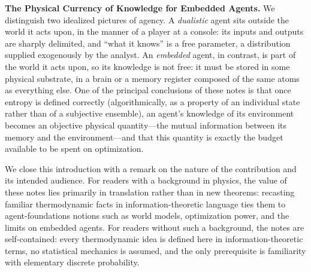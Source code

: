 \documentclass[10pt]{article}
\theoremstyle{definition}
\theoremstyle{remark}
\begin{document}
\textbf{The Physical Currency of Knowledge for Embedded Agents.} We distinguish two idealized pictures of agency. A \emph{dualistic} agent sits outside the world it acts upon, in the manner of a player at a console: its inputs and outputs are sharply delimited, and ``what it knows'' is a free parameter, a distribution supplied exogenously by the analyst. An \emph{embedded} agent, in contrast, is part of the world it acts upon, so its knowledge is not free: it must be stored in some physical substrate, in a brain or a memory register composed of the same atoms as everything else. One of the principal conclusions of these notes is that once entropy is defined correctly (algorithmically, as a property of an individual state rather than of a subjective ensemble), an agent's knowledge of its environment becomes an objective physical quantity---the mutual information between its memory and the environment---and that this quantity is exactly the budget available to be spent on optimization.

We close this introduction with a remark on the nature of the contribution and its intended audience. For readers with a background in physics, the value of these notes lies primarily in translation rather than in new theorems: recasting familiar thermodynamic facts in information-theoretic language ties them to agent-foundations notions such as world models, optimization power, and the limits on embedded agents. For readers without such a background, the notes are self-contained: every thermodynamic idea is defined here in information-theoretic terms, no statistical mechanics is assumed, and the only prerequisite is familiarity with elementary discrete probability.
\end{document}
